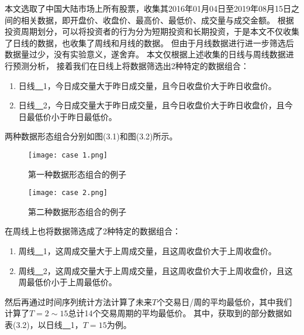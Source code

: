 本文选取了中国大陆市场上所有股票，收集其2016年01月04日至2019年08月15日之间的相关数据，即开盘价、收盘价、最高价、最低价、成交量与成交金额。
根据投资周期划分，可以将投资者的行为分为短期投资和长期投资，于是本文不仅收集了日线的数据，也收集了周线和月线的数据。
但由于月线数据进行进一步筛选后数据量过少，没有实验意义，遂舍弃。
本文仅根据上述收集的日线与周线数据进行预测分析，
接着我们在日线上将数据筛选出2种特定的数据组合：
\begin{enumerate}
    \item 日线\underline{~~}1，今日成交量大于昨日成交量，且今日收盘价大于昨日收盘价。
    \item 日线\underline{~~}2，今日成交量大于昨日成交量，且今日收盘价大于昨日收盘价，且今日最低价小于昨日最低价。
\end{enumerate}

两种数据形态组合分别如图(3.1)和图(3.2)所示。

\begin{figure}[ht]
    \centering
    \texttt{[image: case 1.png]}
    \caption{第一种数据形态组合的例子}
\end{figure}

\begin{figure}[ht]
    \centering
    \texttt{[image: case 2.png]}
    \caption{第二种数据形态组合的例子}
\end{figure}

在周线上也将数据筛选成了2种特定的数据组合：
\begin{enumerate}
    \item 周线\underline{~~}1，这周成交量大于上周成交量，且这周收盘价大于上周收盘价。
    \item 周线\underline{~~}2，这周成交量大于上周成交量，且这周收盘价大于上周收盘价，且这周最低价小于上周最低价。
\end{enumerate}
然后再通过时间序列统计方法计算了未来$T$个交易日/周的平均最低价，其中我们计算了$T=2\sim15$总计14个交易周期的平均最低价。
其中，获取到的部分数据如表(3.2)，以日线\underline{~~}1，$T=15$为例。

